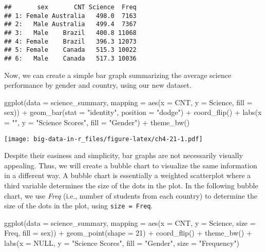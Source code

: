 \documentclass[
]{book}
\newenvironment{Shaded}{\begin{snugshade}}{\end{snugshade}}
\newcommand{\AttributeTok}[1]{\textcolor[rgb]{0.77,0.63,0.00}{#1}}
\newcommand{\ConstantTok}[1]{\textcolor[rgb]{0.00,0.00,0.00}{#1}}
\newcommand{\DecValTok}[1]{\textcolor[rgb]{0.00,0.00,0.81}{#1}}
\newcommand{\FunctionTok}[1]{\textcolor[rgb]{0.00,0.00,0.00}{#1}}
\newcommand{\NormalTok}[1]{#1}
\newcommand{\SpecialCharTok}[1]{\textcolor[rgb]{0.00,0.00,0.00}{#1}}
\newcommand{\StringTok}[1]{\textcolor[rgb]{0.31,0.60,0.02}{#1}}
\begin{document}
\begin{verbatim}
##       sex       CNT Science  Freq
## 1: Female Australia   498.0  7163
## 2:   Male Australia   499.4  7367
## 3:   Male    Brazil   400.8 11068
## 4: Female    Brazil   396.3 12073
## 5: Female    Canada   515.3 10022
## 6:   Male    Canada   517.3 10036
\end{verbatim}

Now, we can create a simple bar graph summarizing the average science performance by gender and country, using our new dataset.

\begin{Shaded}
\begin{Highlighting}[]
\FunctionTok{ggplot}\NormalTok{(}\AttributeTok{data =}\NormalTok{ science\_summary,}
       \AttributeTok{mapping =} \FunctionTok{aes}\NormalTok{(}\AttributeTok{x =}\NormalTok{ CNT, }\AttributeTok{y =}\NormalTok{ Science, }\AttributeTok{fill =}\NormalTok{ sex)) }\SpecialCharTok{+}
  \FunctionTok{geom\_bar}\NormalTok{(}\AttributeTok{stat =} \StringTok{"identity"}\NormalTok{, }\AttributeTok{position =} \StringTok{"dodge"}\NormalTok{) }\SpecialCharTok{+}
  \FunctionTok{coord\_flip}\NormalTok{() }\SpecialCharTok{+}
  \FunctionTok{labs}\NormalTok{(}\AttributeTok{x =} \StringTok{""}\NormalTok{, }\AttributeTok{y =} \StringTok{"Science Scores"}\NormalTok{, }\AttributeTok{fill =} \StringTok{"Gender"}\NormalTok{) }\SpecialCharTok{+}
  \FunctionTok{theme\_bw}\NormalTok{()}
\end{Highlighting}
\end{Shaded}

\texttt{[image: big-data-in-r\_files/figure-latex/ch4-21-1.pdf]}

Despite their easiness and simplicity, bar graphs are not necessarily visually appealing. Thus, we will create a bubble chart to visualize the same information in a different way. A bubble chart is essentially a weighted scatterplot where a third variable determines the size of the dots in the plot. In the following bubble chart, we use \emph{Freq} (i.e., number of students from each country) to determine the size of the dots in the plot, using \texttt{size\ =\ Freq}.

\begin{Shaded}
\begin{Highlighting}[]
\FunctionTok{ggplot}\NormalTok{(}\AttributeTok{data =}\NormalTok{ science\_summary,}
       \AttributeTok{mapping =} \FunctionTok{aes}\NormalTok{(}\AttributeTok{x =}\NormalTok{ CNT, }\AttributeTok{y =}\NormalTok{ Science, }\AttributeTok{size =}\NormalTok{ Freq, }\AttributeTok{fill =}\NormalTok{ sex)) }\SpecialCharTok{+}
  \FunctionTok{geom\_point}\NormalTok{(}\AttributeTok{shape =} \DecValTok{21}\NormalTok{) }\SpecialCharTok{+}
  \FunctionTok{coord\_flip}\NormalTok{() }\SpecialCharTok{+}
  \FunctionTok{theme\_bw}\NormalTok{() }\SpecialCharTok{+}
  \FunctionTok{labs}\NormalTok{(}\AttributeTok{x =} \ConstantTok{NULL}\NormalTok{, }\AttributeTok{y =} \StringTok{"Science Scores"}\NormalTok{, }\AttributeTok{fill =} \StringTok{"Gender"}\NormalTok{,}
       \AttributeTok{size =} \StringTok{"Frequency"}\NormalTok{)}
\end{Highlighting}
\end{Shaded}
\end{document}
